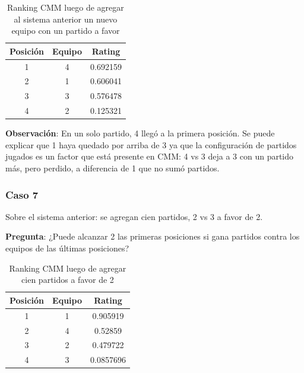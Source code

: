 \begin{table}[h!]
    \begin{center}
        \begin{tabular}{|c|c|c|}
        \hline
        \textbf{Posición} & \textbf{Equipo} & \textbf{Rating} \\
        \hline
        1 & 4 & 0.692159\\
        2 & 1 & 0.606041\\
        3 & 3 & 0.576478\\
        4 & 2 & 0.125321\\
        \hline
        \end{tabular}
        \caption{Ranking CMM luego de agregar al sistema anterior un nuevo equipo con un partido a favor}
        \label{cmm_caso_6}
    \end{center}
\end{table}

\textbf{Observación}: En un solo partido, 4 llegó a la primera posición. Se puede explicar que 1 haya quedado por arriba de 3 ya que la configuración de partidos jugados es un factor que está presente en CMM: 4 vs 3 deja a 3 con un partido más, pero perdido, a diferencia de 1 que no sumó partidos.

\newpage

\subsubsection*{Caso 7}\label{caso_7}

Sobre el sistema anterior: se agregan cien partidos, 2 vs 3 a favor de 2.

\textbf{Pregunta}: ¿Puede alcanzar 2 las primeras posiciones si gana partidos contra los equipos de las últimas posiciones?

\begin{table}[h!]
    \begin{center}
        \begin{tabular}{|c|c|c|}
        \hline
        \textbf{Posición} & \textbf{Equipo} & \textbf{Rating} \\
        \hline
        1 & 1 & 0.905919\\
        2 & 4 & 0.52859\\
        3 & 2 & 0.479722\\
        4 & 3 & 0.0857696\\
        \hline
        \end{tabular}
        \caption{Ranking CMM luego de agregar cien partidos a favor de 2}
        \label{cmm_caso_7}
    \end{center}
\end{table}

